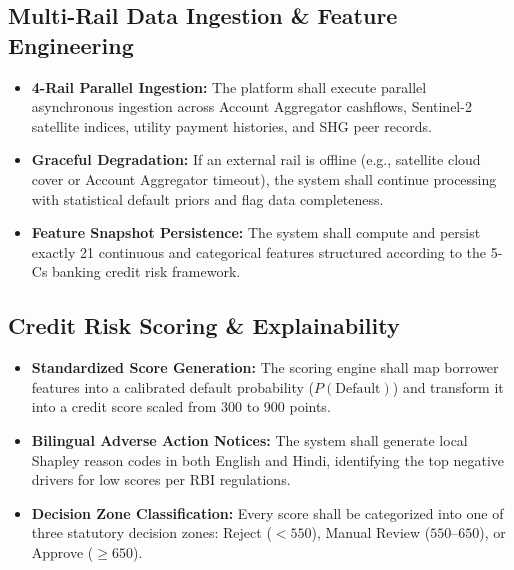 \documentclass[11pt,a4paper,oneside]{report}
\begin{document}
\subsection{Multi-Rail Data Ingestion \& Feature Engineering}
\begin{itemize}[leftmargin=2em, label=\textbf{FR-\arabic*.}]
  \setcounter{enumi}{3}
  \item \textbf{4-Rail Parallel Ingestion:} The platform shall execute parallel asynchronous ingestion across Account Aggregator cashflows, Sentinel-2 satellite indices, utility payment histories, and SHG peer records.
  \item \textbf{Graceful Degradation:} If an external rail is offline (e.g., satellite cloud cover or Account Aggregator timeout), the system shall continue processing with statistical default priors and flag data completeness.
  \item \textbf{Feature Snapshot Persistence:} The system shall compute and persist exactly 21 continuous and categorical features structured according to the 5-Cs banking credit risk framework.
\end{itemize}

\subsection{Credit Risk Scoring \& Explainability}
\begin{itemize}[leftmargin=2em, label=\textbf{FR-\arabic*.}]
  \setcounter{enumi}{6}
  \item \textbf{Standardized Score Generation:} The scoring engine shall map borrower features into a calibrated default probability ($P(\text{Default})$) and transform it into a credit score scaled from 300 to 900 points.
  \item \textbf{Bilingual Adverse Action Notices:} The system shall generate local Shapley reason codes in both English and Hindi, identifying the top negative drivers for low scores per RBI regulations.
  \item \textbf{Decision Zone Classification:} Every score shall be categorized into one of three statutory decision zones: Reject ($<550$), Manual Review ($550\text{--}650$), or Approve ($\ge 650$).
\end{itemize}
\end{document}

